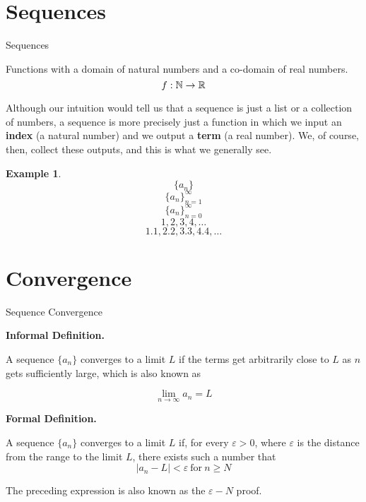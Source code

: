 \documentclass{report}
\newtheorem*{remark*}{Example}
\begin{document}
\begin{sloppypar}
\section{Sequences}
\begin{center}
      \dfn
       {Sequences}
              {Functions with a domain of natural numbers and a co-domain
      of real numbers.
      \[ f: \mathbb{N} \rightarrow \mathbb{R} \]
      \par Although our intuition would tell us that a sequence
        is just a list or a collection of numbers,
        a sequence is more precisely just a function in which
        we input an \textbf{index} (a natural number) and we
        output a \textbf{term} (a real number). We, of course,
        then, collect these outputs, and this is what we
        generally see.}


        \begin{remark*}
          \[ \{ a_{n} \}\]
          \[ \{ a_{n}\}_{n=1}^{\infty}\]
          \[ \{ a_{n}\}_{n=0}^{\infty}\]
          \[ 1, 2, 3, 4, \dots\]
          \[ 1.1, 2.2, 3.3, 4.4, \dots \]

          \end{remark*}

\end{center}

\section{Convergence}
\begin{center}
      \dfn
        {Sequence Convergence}
      {\textbf{Informal Definition.}
      \par A sequence $ \{ a_{n }\} $ converges to a limit $ L $
      if the terms get arbitrarily close to $ L $ as $ n $
      gets sufficiently large, which is also known as

      \[ \lim_{n\rightarrow\infty}a_{n} = L \]
      \par
      \textbf{Formal Definition.}
      \par A sequence $ \{ a_{n}\} $ converges to a limit $ L $
      if, for every $ \varepsilon > 0 $, where $ \varepsilon $ is the distance from
      the range to the limit $ L $, there exists such a number
      that
      \[ |a_{n}- L| < \varepsilon ~\textrm{for}~ n \geq N \]

      The preceding expression is also known as the $ \varepsilon - N $ proof.
      \[ \]}
\end{center}


\end{sloppypar}
\end{document}
